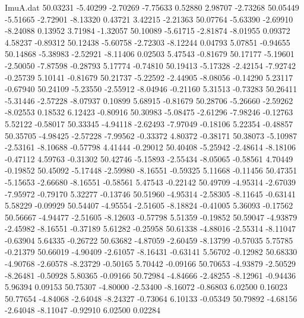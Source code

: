 \begin{filecontents}{ImuA.dat}
  50.03231   -5.40299   -2.70269   -7.75633    0.52880    2.98707   -2.73268
  50.05449   -5.51665   -2.72901   -8.13320    0.43721    3.42215   -2.21363
  50.07764   -5.63390   -2.69910   -8.24088    0.13952    3.71984   -1.32057
  50.10089   -5.61715   -2.81874   -8.01955    0.09372    4.58237   -0.89312
  50.12438   -5.60758   -2.72303   -8.12244    0.04793    5.07851   -0.94655
  50.14868   -5.38983   -2.52921   -8.11406    0.02503    5.47543   -0.81679
  50.17177   -5.19601   -2.50050   -7.87598   -0.28793    5.17774   -0.74810
  50.19413   -5.17328   -2.42154   -7.92742   -0.25739    5.10141   -0.81679
  50.21737   -5.22592   -2.44905   -8.08056   -0.14290    5.23117   -0.67940
  50.24109   -5.23550   -2.55912   -8.04946   -0.21160    5.31513   -0.73283
  50.26411   -5.31446   -2.57228   -8.07937    0.10899    5.68915   -0.81679
  50.28706   -5.26660   -2.59262   -8.02553    0.18532    6.12423   -0.80916
  50.30983   -5.08475   -2.61296   -7.98246   -0.12763    5.52122   -0.58017
  50.33345   -4.94118   -2.62493   -7.97049   -0.18106    5.22354   -0.48857
  50.35705   -4.98425   -2.57228   -7.99562   -0.33372    4.80372   -0.38171
  50.38073   -5.10987   -2.53161   -8.10688   -0.57798    4.41444   -0.29012
  50.40408   -5.25942   -2.48614   -8.18106   -0.47112    4.59763   -0.31302
  50.42746   -5.15893   -2.55434   -8.05065   -0.58561    4.70449   -0.19852
  50.45092   -5.17448   -2.59980   -8.16551   -0.59325    5.11668   -0.11456
  50.47351   -5.15653   -2.66680   -8.16551   -0.58561    5.47543   -0.22142
  50.49709   -4.95314   -2.67039   -7.95972   -0.79170    5.32277   -0.13746
  50.51960   -4.95314   -2.58305   -8.11645   -0.63141    5.58229   -0.09929
  50.54407   -4.95554   -2.51605   -8.18824   -0.41005    5.36093   -0.17562
  50.56667   -4.94477   -2.51605   -8.12603   -0.57798    5.51359   -0.19852
  50.59047   -4.93879   -2.45982   -8.16551   -0.37189    5.61282   -0.25958
  50.61338   -4.88016   -2.55314   -8.11047   -0.63904    5.64335   -0.26722
  50.63682   -4.87059   -2.60459   -8.13799   -0.57035    5.75785   -0.21379
  50.66019   -4.90409   -2.61057   -8.16431   -0.63141    5.56702   -0.12982
  50.68330   -4.90768   -2.60578   -8.23729   -0.50165    5.70442   -0.09166
  50.70653   -4.93879   -2.50529   -8.26481   -0.50928    5.80365   -0.09166
  50.72984   -4.84666   -2.48255   -8.12961   -0.94436    5.96394    0.09153
  50.75307   -4.80000   -2.53400   -8.16072   -0.86803    6.02500    0.16023
  50.77654   -4.84068   -2.64048   -8.24327   -0.73064    6.10133   -0.05349
  50.79892   -4.68156   -2.64048   -8.11047   -0.92910    6.02500    0.02284

\end{filecontents}
